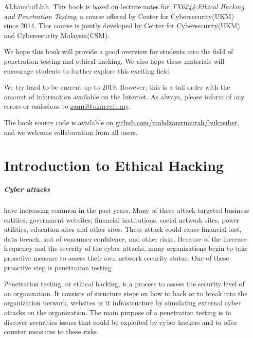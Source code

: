 \documentclass[7x9]{times}
\begin{document}
\begin{preface}

ALhamduiLlah. This book is based on lecture notes for
\textit{TX6244:Ethical Hacking and Penetration Testing}, a course
offered by Center for Cybersecurity(UKM) since 2014. This course is
jointly developed by Center for Cybersecurity(UKM) and Cybersecurity
Malaysia(CSM).

We hope this book will provide a good overview for students into the
field of penetration testing and ethical hacking. We also hope these
materials will encourage students to further explore this exciting
field.

We try hard to be current up to 2019. However, this is a tall order
with the amount of information available on the Internet. As always,
please inform of any errors or omissions to \url{zamri@ukm.edu.my}.

The book source code is available on
\url{github.com/mohdzamrimurah/bukusiber}, and we welcome
collaboration from all users.



\end{preface}

\chapter{Introduction to Ethical Hacking}

\paragraph{Cyber attacks} have increasing common in the past
years. Many of these attack targeted business entities,
government websites, financial institutions, social network
sites, power utilities, education sites and other sites.
These attack could cause financial lost, data breach, lost
of consumer confidence, and other risks. Because of the
increase frequency and the severity of the cyber attacks,
many organizations begin to take proactive measure to assess
their own network security status. One of these proactive
step is penetration testing.

Penetration testing, or ethical hacking, is a process to
assess the security level of an organization. It consists of
structure steps on how to hack or to break into the
organization network, websites or it infrastructure by
simulating external cyber attacks on the organization. The
main purpose of a penetration testing is to discover
securities issues that could be exploited by cyber hackers
and to offer counter measures to these risks.
\end{document}
